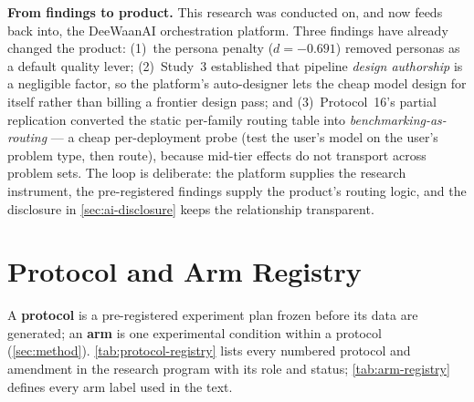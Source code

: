 \documentclass[12pt,a4paper]{article}
\begin{document}
\textbf{From findings to product.} This research was conducted on, and now
feeds back into, the DeeWaanAI orchestration platform. Three findings have
already changed the product: (1)~the persona penalty ($d = -0.691$) removed
personas as a default quality lever; (2)~Study~3 established that pipeline
\emph{design authorship} is a negligible factor, so the platform's
auto-designer lets the cheap model design for itself rather than billing a
frontier design pass; and (3)~Protocol~16's partial replication converted the
static per-family routing table into \emph{benchmarking-as-routing} --- a
cheap per-deployment probe (test the user's model on the user's problem type,
then route), because mid-tier effects do not transport across problem sets.
The loop is deliberate: the platform supplies the research instrument, the
pre-registered findings supply the product's routing logic, and the
disclosure in \cref{sec:ai-disclosure} keeps the relationship transparent.

\clearpage
\section{Protocol and Arm Registry}\label{app:registry}

A \textbf{protocol} is a pre-registered experiment plan frozen before its data
are generated; an \textbf{arm} is one experimental condition within a protocol
(\cref{sec:method}). \cref{tab:protocol-registry} lists every numbered
protocol and amendment in the research program with its role and status;
\cref{tab:arm-registry} defines every arm label used in the text.
\end{document}

